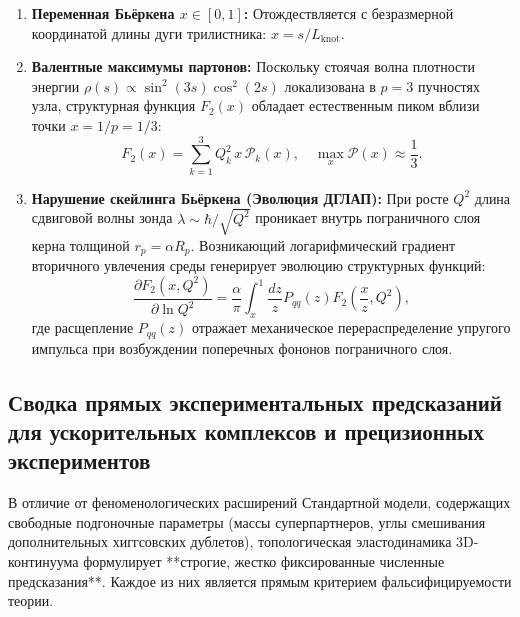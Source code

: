 \documentclass[12pt,a4paper]{article}
\begin{document}
	\begin{enumerate}
		\item \textbf{Переменная Бьёркена $x \in [0, 1]$:} Отождествляется с безразмерной координатой длины дуги трилистника: $x = s / L_{\text{knot}}$.
		\item \textbf{Валентные максимумы партонов:} Поскольку стоячая волна плотности энергии $\rho(s) \propto \sin^2(3s)\cos^2(2s)$ локализована в $p=3$ пучностях узла, структурная функция $F_2(x)$ обладает естественным пиком вблизи точки $x = 1/p = 1/3$:
		\begin{equation}
			F_2(x) = \sum_{k=1}^3 Q_k^2 \, x \, \mathcal{P}_k(x), \quad \max_x \mathcal{P}(x) \approx \frac{1}{3}.
		\end{equation}
		\item \textbf{Нарушение скейлинга Бьёркена (Эволюция ДГЛАП):} При росте $Q^2$ длина сдвиговой волны зонда $\lambda \sim \hbar/\sqrt{Q^2}$ проникает внутрь пограничного слоя керна толщиной $r_p = \alpha R_p$. Возникающий логарифмический градиент вторичного увлечения среды генерирует эволюцию структурных функций:
		\begin{equation}
			\frac{\partial F_2(x, Q^2)}{\partial \ln Q^2} = \frac{\alpha}{\pi} \int_x^1 \frac{dz}{z} P_{qq}(z) F_2\left(\frac{x}{z}, Q^2\right),
		\end{equation}
		где расщепление $P_{qq}(z)$ отражает механическое перераспределение упругого импульса при возбуждении поперечных фононов пограничного слоя.
	\end{enumerate}

	\subsection{Сводка прямых экспериментальных предсказаний для ускорительных комплексов и прецизионных экспериментов}
	
	В отличие от феноменологических расширений Стандартной модели, содержащих свободные подгоночные параметры (массы суперпартнеров, углы смешивания дополнительных хиггсовских дублетов), топологическая эластодинамика 3D-континуума формулирует **строгие, жестко фиксированные численные предсказания**. Каждое из них является прямым критерием фальсифицируемости теории.
		
	
\end{document}
